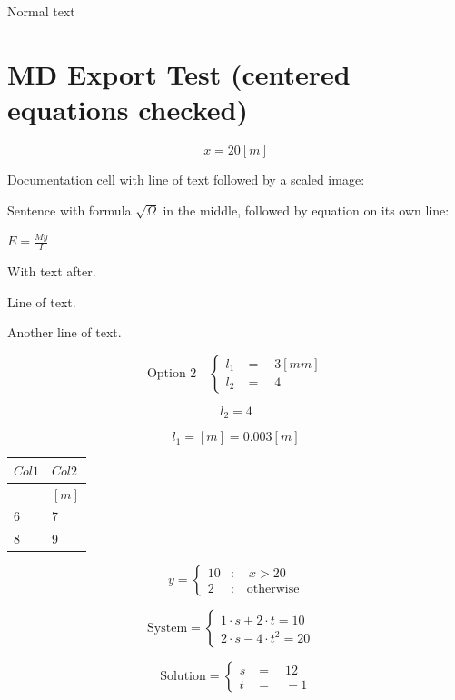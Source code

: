 \documentclass[
  a4paper,
]{article}
\newcounter{none} %
\begin{document}
Normal text

\section{MD Export Test (centered equations
checked)}\label{md-export-test-centered-equations-checked}

\[ x=20\left\lbrack m\right\rbrack   \]

Documentation cell with line of text followed by a scaled image:

Sentence with formula \(\sqrt{\Omega}\) in the middle, followed by
equation on its own line:

\(E=\frac{My}{I}\)

With text after.

Line of text.

Another line of text.

\[ \text{Option 2} \quad  \begin{cases} l_1 & = \quad 3 \left\lbrack mm\right\rbrack \\ l_2 & = \quad 4  \end{cases} \]

\[ l_2= 4   \]

\[ l_1=\left\lbrack m\right\rbrack =0.003 \left\lbrack m\right\rbrack  \]

{\def\LTcaptype{none} %
\begin{longtable}[]{@{}ll@{}}
\toprule\noalign{}
\(Col1\) & \(Col2\) \\
\midrule\noalign{}
\endhead
\bottomrule\noalign{}
\endlastfoot
& \(\left\lbrack m\right\rbrack\) \\
6 & 7 \\
8 & 9 \\
\end{longtable}
}

\[ y = \begin{cases} 10 &: \quad x>20 \\ 2 &: \quad \text{otherwise} \end{cases} \]

\[ \text{System} = \begin{cases} 1\cdot s+2\cdot t=10 &  \\ 2\cdot s-4\cdot t^2=20 &  \end{cases} \]

\[ \text{Solution} = \begin{cases} s & = \quad 12 \\ t & = \quad -1 \end{cases} \]
\end{document}
